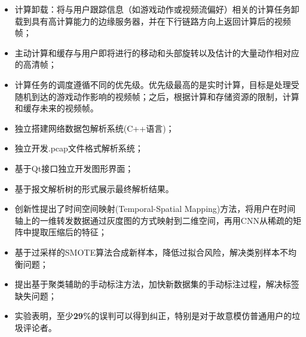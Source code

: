 \documentclass{resume}
\begin{document}
\begin{itemize}
  \item 计算卸载：将与用户跟踪信息（如游戏动作或视频流偏好）相关的计算任务卸载到具有高计算能力的边缘服务器，并在下行链路方向上返回计算后的视频帧；
  \item 主动计算和缓存与用户即将进行的移动和头部旋转以及估计的大量动作相对应的高清帧；
  \item 计算任务的调度遵循不同的优先级。优先级最高的是实时计算，目标是处理受随机到达的游戏动作影响的视频帧；之后，根据计算和存储资源的限制，计算和缓存未来的视频帧。
\end{itemize}

\begin{itemize}
  \item 独立搭建网络数据包解析系统(C++语言)；
  \item 独立开发.pcap文件格式解析系统；
  \item 基于Qt接口独立开发图形界面；
  \item 基于报文解析树的形式展示最终解析结果。
\end{itemize}

\begin{itemize}
  \item 创新性提出了时间空间映射(Temporal-Spatial Mapping)方法，将用户在时间轴上的一维转发数据通过灰度图的方式映射到二维空间，再用CNN从稀疏的矩阵中提取压缩后的特征；
  \item 基于过采样的SMOTE算法合成新样本，降低过拟合风险，解决类别样本不均衡问题；
  \item 提出基于聚类辅助的手动标注方法，加快新数据集的手动标注过程，解决标签缺失问题；
  \item 实验表明，至少\textbf{29\%}的误判可以得到纠正，特别是对于故意模仿普通用户的垃圾评论者。
\end{itemize}
\end{document}
